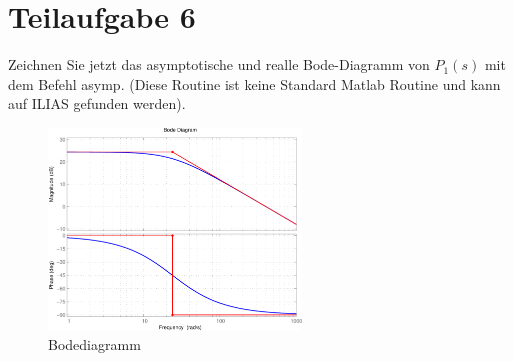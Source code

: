 \section{Teilaufgabe 6}
\begin{aufgabe}
    Zeichnen Sie jetzt das asymptotische und realle Bode-Diagramm von $P_1(s)$ 
    mit dem Befehl asymp. (Diese Routine ist keine Standard Matlab Routine und 
    kann auf ILIAS gefunden werden).
\end{aufgabe}
\begin{figure}[h!]
    \centering
    \includegraphics[width=0.6\textwidth]{06/asymp_plot.pdf}
    \caption{Bodediagramm}
    \label{fig:06plot}
\end{figure}
